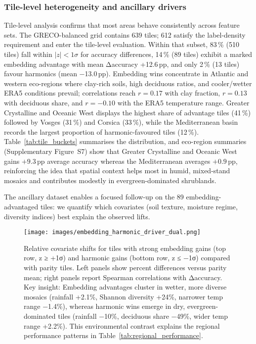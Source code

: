 \documentclass[utf8]{FrontiersinHarvard}
\begin{document}
\subsubsection{Tile-level heterogeneity and ancillary drivers}

Tile-level analysis confirms that most areas behave consistently across feature sets. The GRECO-balanced grid contains 639 tiles; 612 satisfy the label-density requirement and enter the tile-level evaluation. Within that subset, 83\,\% (510 tiles) fall within \(|z| < 1\sigma\) for accuracy differences, 14\,\% (89 tiles) exhibit a marked embedding advantage with mean Δaccuracy +12.6\,pp, and only 2\,\% (13 tiles) favour harmonics (mean −13.0\,pp). Embedding wins concentrate in Atlantic and western eco-regions where clay-rich soils, high deciduous ratios, and cooler/wetter ERA5 conditions prevail; correlations reach \(r=0.17\) with clay fraction, \(r=0.13\) with deciduous share, and \(r=-0.10\) with the ERA5 temperature range. Greater Crystalline and Oceanic West displays the highest share of advantage tiles (41\,\%) followed by Vosges (31\,\%) and Corsica (33\,\%), while the Mediterranean basin records the largest proportion of harmonic-favoured tiles (12\,\%). Table~\ref{tab:tile_buckets} summarises the distribution, and eco-region summaries (Supplementary Figure~S7) show that Greater Crystalline and Oceanic West gains \(+9.3\)\,pp average accuracy whereas the Mediterranean averages \(+0.9\)\,pp, reinforcing the idea that spatial context helps most in humid, mixed-stand mosaics and contributes modestly in evergreen-dominated shrublands.

The ancillary dataset enables a focused follow-up on the 89 embedding-advantaged tiles: we quantify which covariates (soil texture, moisture regime, diversity indices) best explain the observed lifts.

\begin{figure}[H]
    \centering
    \texttt{[image: images/embedding\_harmonic\_driver\_dual.png]}
    \caption{Relative covariate shifts for tiles with strong embedding gains (top row, z ≥ +1σ) and harmonic gains (bottom row, z ≤ −1σ) compared with parity tiles. Left panels show percent differences versus parity mean; right panels report Spearman correlations with Δaccuracy. Key insight: Embedding advantages cluster in wetter, more diverse mosaics (rainfall +2.1\%, Shannon diversity +24\%, narrower temp range −1.4\%), whereas harmonic wins emerge in dry, evergreen-dominated tiles (rainfall −10\%, deciduous share −49\%, wider temp range +2.2\%). This environmental contrast explains the regional performance patterns in Table~\ref{tab:regional_performance}.}
    \label{fig:driver_deltas}
\end{figure}
\end{document}

